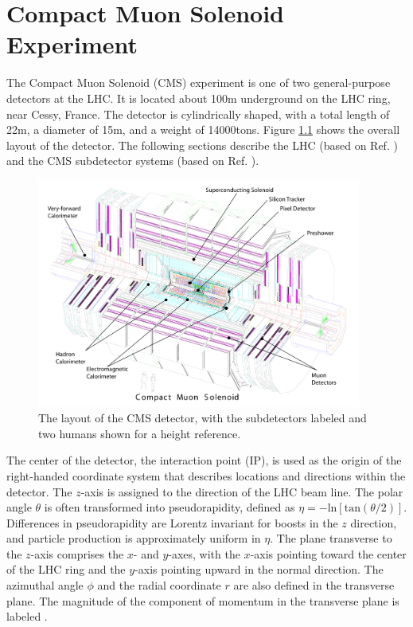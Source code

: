\chapter{Compact Muon Solenoid Experiment
\label{ch:cmsexperiment}}
\setcounter{section}{-1}

The Compact Muon Solenoid (CMS) experiment is one of two general-purpose detectors at the LHC. It is located about 100\unit{m} underground on the LHC ring, near Cessy, France. The detector is cylindrically shaped, with a total length of 22\unit{m}, a diameter of 15\unit{m}, and a weight of 14000\unit{tons}. Figure \ref{fig:cms-overall} shows the overall layout of the detector. The following sections describe the LHC (based on Ref. \cite{LHCmachine}) and the CMS subdetector systems (based on Ref. \cite{CMSJINST}).

\begin{figure}[hbt]
\begin{center}
\includegraphics[width=0.95\textwidth]{figures/cms_complete_labelled.pdf}
\caption{The layout of the CMS detector, with the subdetectors labeled and two humans shown for a height reference.}
\label{fig:cms-overall}
\end{center}
\end{figure}

The center of the detector, the interaction point (IP), is used as the origin of the right-handed coordinate system that describes locations and directions within the detector. The $z$-axis is assigned to the direction of the LHC beam line. The polar angle $\theta$ is often transformed into pseudorapidity, defined as $\eta = -\text{ln}[\text{tan}(\theta/2)]$. Differences in pseudorapidity are Lorentz invariant for boosts in the $z$ direction, and particle production is approximately uniform in $\eta$. The plane transverse to the $z$-axis comprises the $x$- and $y$-axes, with the $x$-axis pointing toward the center of the LHC ring and the $y$-axis pointing upward in the normal direction. The azimuthal angle $\phi$ and the radial coordinate $r$ are also defined in the transverse plane. The magnitude of the component of momentum in the transverse plane is labeled \pt.

